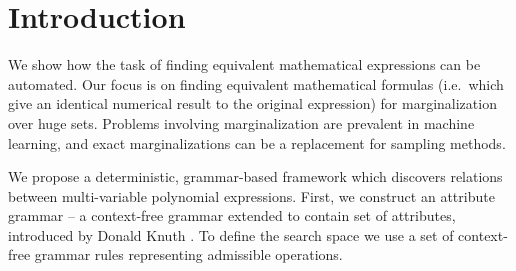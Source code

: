 \section{Introduction} \label{introduction} 

We show how the task of finding equivalent
mathematical expressions can be automated. Our focus is on finding equivalent
mathematical formulas (i.e.~which give an identical numerical result
to the original expression) for marginalization over huge sets. 
Problems involving marginalization are prevalent in machine learning, and 
exact marginalizations can be a replacement for sampling methods.

We propose a deterministic, grammar-based framework which discovers
relations between multi-variable polynomial expressions. First, we
construct an attribute grammar -- a context-free grammar extended to
contain set of attributes, introduced by Donald Knuth
\cite{knuth1968semantics}. To define the search space we use a set of
context-free grammar rules representing admissible operations. 



